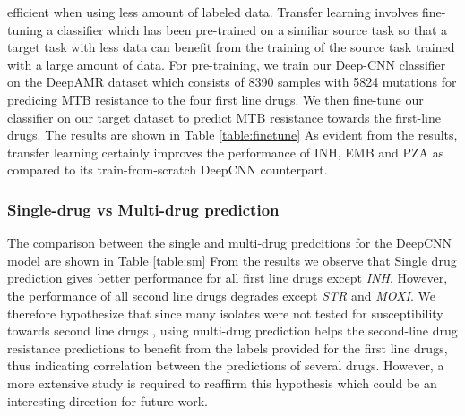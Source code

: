 \documentclass{article}
\begin{document}
efficient when using less amount of labeled data. Transfer learning involves fine-tuning a classifier
which has been pre-trained on a similiar source task so that a target task with less data can benefit
from the training of the source task trained with a large amount of data. For pre-training, we train our
Deep-CNN classifier on the DeepAMR \cite{10.1093/bioinformatics/btz067} dataset which consists of 
8390 samples with 5824 mutations for
predicing MTB resistance to the four first line drugs. We then fine-tune our classifier on our target
dataset to predict MTB resistance towards the first-line drugs. The results are shown in Table \ref{table:finetune}
As evident from the results, transfer learning certainly improves the performance of INH, EMB and PZA as
compared to its train-from-scratch DeepCNN counterpart.

\subsubsection{Single-drug vs Multi-drug prediction}
The comparison between the single and multi-drug predcitions for the DeepCNN model are shown in Table \ref{table:sm}
From the results we observe that Single drug prediction gives better performance for all first line drugs except
\textit{INH}. However, the performance of all second line drugs degrades except \textit{STR} and \textit{MOXI}.
We therefore hypothesize that since many isolates were not tested for susceptibility towards second line drugs
, using multi-drug prediction helps the second-line drug resistance predictions to benefit from the labels
provided for the first line drugs, thus indicating correlation between the predictions of several drugs. However,
a more extensive study is required to reaffirm this hypothesis which could be an interesting direction for future
work.
\end{document}
